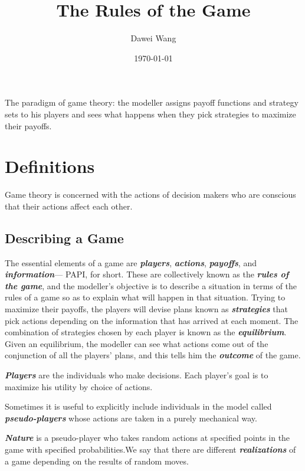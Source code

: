 \documentclass{article}
\title{The Rules of the Game}
\author{Dawei Wang}
\date{\today}
\begin{document}
	\maketitle

The paradigm of game theory: the modeller assigns payoff functions and strategy sets to his players and sees what happens when they pick strategies to maximize their payoffs.

\section{Definitions}
 Game theory is concerned with the actions of decision makers who are conscious that their actions affect each other.
 
\subsection{Describing a Game}

The essential elements of a game are \textbf{\textit{players}}, \textbf{\textit{actions}}, \textbf{\textit{payoffs}}, and \textbf{\textit{information}}— PAPI,
for short. These are collectively known as the \textbf{\textit{rules of the game}}, and the modeller’s
objective is to describe a situation in terms of the rules of a game so as to explain what will
happen in that situation. Trying to maximize their payoffs, the players will devise plans
known as \textbf{\textit{strategies}} that pick actions depending on the information that has arrived
at each moment. The combination of strategies chosen by each player is known as the
\textbf{\textit{equilibrium}}. Given an equilibrium, the modeller can see what actions come out of the
conjunction of all the players’ plans, and this tells him the \textbf{\textit{outcome}} of the game.

\hspace*{\fill}

\textbf{\textit{Players}} are the individuals who make decisions. Each player’s goal is to maximize his
utility by choice of actions.

Sometimes it is useful to explicitly include individuals in the model called \textbf{\textit{pseudo-players}}
whose actions are taken in a purely mechanical way.

\textbf{\textit{Nature}} is a pseudo-player who takes random actions at specified points in the game with
specified probabilities.We say
that there are different \textbf{\textit{realizations}} of a game depending on the results of random moves.
\end{document}
